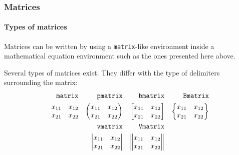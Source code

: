 \documentclass[11pt]{beamer}
\begin{document}
\begin{frame}
	\frametitle{Matrices}
	\framesubtitle{Types of matrices}
	
	Matrices can be written by using a \texttt{matrix}-like environment inside a mathematical equation environment such as the ones presented here above.
	
	Several types of matrices exist.
	They differ with the type of delimiters surrounding the matrix:
	\begin{align*}
		\text{\texttt{matrix}} && \text{\texttt{pmatrix}} && \text{\texttt{bmatrix}} && \text{\texttt{Bmatrix}} \\
		\begin{matrix}
			x_{11} & x_{12} \\
			x_{21} & x_{22} \\
		\end{matrix} 
		&&
		\begin{pmatrix}
			x_{11} & x_{12} \\
			x_{21} & x_{22} \\
		\end{pmatrix}
		&&
		\begin{bmatrix}
			x_{11} & x_{12} \\
			x_{21} & x_{22} \\
		\end{bmatrix}
		&&
		\begin{Bmatrix}
			x_{11} & x_{12} \\
			x_{21} & x_{22} \\
		\end{Bmatrix} \\
		&& \text{\texttt{vmatrix}} && \text{\texttt{Vmatrix}} && \\
		&&
		\begin{vmatrix}
			x_{11} & x_{12} \\
			x_{21} & x_{22} \\
		\end{vmatrix}
		&&
		\begin{Vmatrix}
			x_{11} & x_{12} \\
			x_{21} & x_{22} \\
		\end{Vmatrix}
		&& \\
	\end{align*}
\end{frame}
\end{document}
